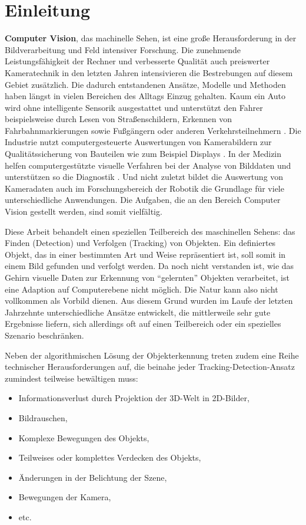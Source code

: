 \section{Einleitung}
\textbf{Computer Vision}, das machinelle Sehen, ist eine große Herausforderung in der Bildverarbeitung und Feld intensiver Forschung. Die zunehmende Leistungsfähigkeit der Rechner und verbesserte Qualität auch preiswerter Kameratechnik in den letzten Jahren intensivieren die Bestrebungen auf diesem Gebiet zusätzlich. Die dadurch entstandenen Ansätze, Modelle und Methoden haben längst in vielen Bereichen des Alltags Einzug gehalten. Kaum ein Auto wird ohne intelligente Sensorik ausgestattet und unterstützt den Fahrer beispielsweise durch Lesen von Straßenschildern, Erkennen von Fahrbahnmarkierungen sowie Fußgängern oder anderen Verkehrsteilnehmern \cite{PED}. Die Industrie nutzt computergesteuerte Auswertungen von Kamerabildern zur Qualitätssicherung von Bauteilen wie zum Beispiel Displays \cite{LCD}. In der Medizin helfen computergestützte visuelle Verfahren bei der Analyse von Bilddaten und unterstützen so die Diagnostik \cite{MIP}. Und nicht zuletzt bildet die Auswertung von Kameradaten auch im Forschungsbereich der Robotik die Grundlage für viele unterschiedliche Anwendungen. Die Aufgaben, die an den Bereich Computer Vision gestellt werden, sind somit vielfältig.

Diese Arbeit behandelt einen speziellen Teilbereich des maschinellen Sehens: das Finden (Detection) und Verfolgen (Tracking) von Objekten. Ein definiertes Objekt, das in einer bestimmten Art und Weise repräsentiert ist, soll somit in einem Bild gefunden und verfolgt werden. Da noch nicht verstanden ist, wie das Gehirn visuelle Daten zur Erkennung von ``gelernten'' Objekten verarbeitet, ist eine Adaption auf Computerebene nicht möglich. Die Natur kann also nicht vollkommen als Vorbild dienen. Aus diesem Grund wurden im Laufe der letzten Jahrzehnte unterschiedliche Ansätze entwickelt, die mittlerweile sehr gute Ergebnisse liefern, sich allerdings oft auf einen Teilbereich oder ein spezielles Szenario beschränken.

Neben der algorithmischen Lösung der Objekterkennung treten zudem eine Reihe technischer Herausforderungen auf, die beinahe jeder Tracking-Detection-Ansatz zumindest teilweise bewältigen muss:

\begin{itemize}
\item Informationsverlust durch Projektion der 3D-Welt in 2D-Bilder,
\item Bildrauschen,
\item Komplexe Bewegungen des Objekts,
\item Teilweises oder komplettes Verdecken des Objekts,
\item Änderungen in der Belichtung der Szene,
\item Bewegungen der Kamera,
\item etc.
\end{itemize}

